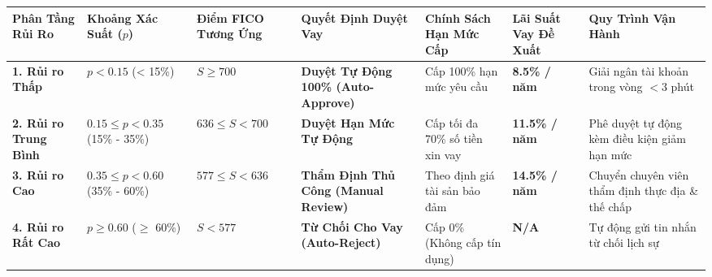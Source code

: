 \documentclass[
  13pt,
  a4paper,
]{report}
\newcounter{none} %
\begin{document}
{\def\LTcaptype{none} %
\begin{longtable}[]{@{}
  >{\raggedright\arraybackslash}p{}
  >{\centering\arraybackslash}p{}
  >{\centering\arraybackslash}p{}
  >{\raggedright\arraybackslash}p{}
  >{\raggedright\arraybackslash}p{}
  >{\centering\arraybackslash}p{}
  >{\raggedright\arraybackslash}p{}@{}}
\toprule\noalign{}
\begin{minipage}[b]{\linewidth}\raggedright
Phân Tầng Rủi Ro
\end{minipage} & \begin{minipage}[b]{\linewidth}\centering
Khoảng Xác Suất (\(p\))
\end{minipage} & \begin{minipage}[b]{\linewidth}\centering
Điểm FICO Tương Ứng
\end{minipage} & \begin{minipage}[b]{\linewidth}\raggedright
Quyết Định Duyệt Vay
\end{minipage} & \begin{minipage}[b]{\linewidth}\raggedright
Chính Sách Hạn Mức Cấp
\end{minipage} & \begin{minipage}[b]{\linewidth}\centering
Lãi Suất Vay Đề Xuất
\end{minipage} & \begin{minipage}[b]{\linewidth}\raggedright
Quy Trình Vận Hành
\end{minipage} \\
\midrule\noalign{}
\endhead
\bottomrule\noalign{}
\endlastfoot
\textbf{1. Rủi ro Thấp} & \(p < 0.15\) (\textless{} 15\%) &
\(S \ge 700\) & \textbf{Duyệt Tự Động 100\% (Auto-Approve)} & Cấp 100\%
hạn mức yêu cầu & \textbf{8.5\% / năm} & Giải ngân tài khoản trong vòng
\(< 3\) phút \\
\textbf{2. Rủi ro Trung Bình} & \(0.15 \le p < 0.35\) (15\% - 35\%) &
\(636 \le S < 700\) & \textbf{Duyệt Hạn Mức Tự Động} & Cấp tối đa 70\%
số tiền xin vay & \textbf{11.5\% / năm} & Phê duyệt tự động kèm điều
kiện giảm hạn mức \\
\textbf{3. Rủi ro Cao} & \(0.35 \le p < 0.60\) (35\% - 60\%) &
\(577 \le S < 636\) & \textbf{Thẩm Định Thủ Công (Manual Review)} & Theo
định giá tài sản bảo đảm & \textbf{14.5\% / năm} & Chuyển chuyên viên
thẩm định thực địa \& thế chấp \\
\textbf{4. Rủi ro Rất Cao} & \(p \ge 0.60\) (\(\ge\) 60\%) & \(S < 577\)
& \textbf{Từ Chối Cho Vay (Auto-Reject)} & Cấp 0\% (Không cấp tín dụng)
& \textbf{N/A} & Tự động gửi tin nhắn từ chối lịch sự \\
\end{longtable}
}
\end{document}
